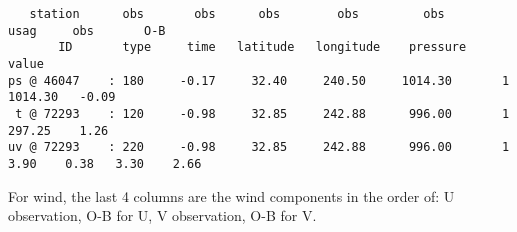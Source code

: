 \begin{scriptsize}
\begin{verbatim}  
   station      obs       obs      obs        obs         obs       usag     obs       O-B
       ID       type     time   latitude   longitude    pressure            value              
ps @ 46047    : 180     -0.17     32.40     240.50     1014.30       1     1014.30   -0.09
 t @ 72293    : 120     -0.98     32.85     242.88      996.00       1      297.25    1.26
uv @ 72293    : 220     -0.98     32.85     242.88      996.00       1        3.90    0.38   3.30    2.66
\end{verbatim}
\end{scriptsize}
 
For wind, the last 4 columns are the wind components in the order of: U observation, O-B for U, V observation, O-B for V.

